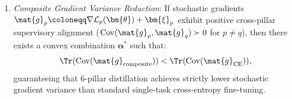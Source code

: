 \begin{theorem}
\begin{enumerate}
\begin{equation}
    \end{equation}
    To reach an $\epsilon$-approximate optimal solution $\mathcal{L}_{\text{total}}(\bm{\theta}_T) - \mathcal{L}^* \le \epsilon$, the total required iteration count is:
    \begin{equation}
    T(\epsilon) \le \frac{1}{\mu \bar{\eta}} \ln\left( \frac{\mathcal{L}_{\text{total}}(\bm{\theta}_0) - \mathcal{L}^*}{\epsilon} \right) = \mathcal{O}\left( \log\frac{1}{\epsilon} \right),
    \label{eq:iteration_complexity}
    \end{equation}
    where $\bar{\eta} \coloneqq \frac{1}{T}\sum_{t=1}^T \eta_t$ is the average step size.
    \item \emph{Composite Gradient Variance Reduction}:
    If stochastic gradients $\mat{g}_p \coloneqq \nabla \mathcal{L}_p(\bm{\theta}) + \bm{\xi}_p$ exhibit positive cross-pillar supervisory alignment ($\operatorname{Cov}(\mat{g}_p, \mat{g}_q) \succ 0$ for $p \ne q$), then there exists a convex combination $\bm{\alpha}^*$ such that:
    \begin{equation}
    \Tr(\operatorname{Cov}(\mat{g}_{\text{composite}})) < \Tr(\operatorname{Cov}(\mat{g}_{\text{CE}})),
    \label{eq:variance_reduction_bound}
    \end{equation}
    guaranteeing that 6-pillar distillation achieves strictly lower stochastic gradient variance than standard single-task cross-entropy fine-tuning.
\end{enumerate}
\end{theorem}

